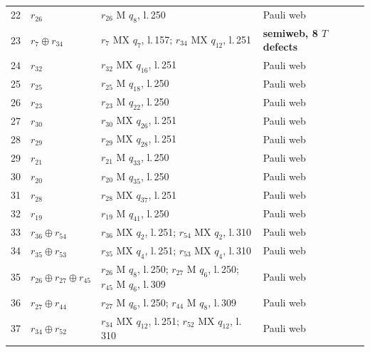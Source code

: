 \documentclass[11pt]{article}
\begin{document}
\begin{semiwebaddition}
{\begin{longtable}{rp{.3\linewidth}p{.43\linewidth}lr}
22 & $r_{26}$ & $r_{26}$ M $q_{8}$, l.\,250 & Pauli web & \hyperref[d5_det022]{\pageref*{d5_det022}}\\
23 & $r_{7}\oplus r_{34}$ & $r_{7}$ MX $q_{7}$, l.\,157; $r_{34}$ MX $q_{12}$, l.\,251 & \textbf{semiweb, 8 $T$ defects} & \hyperref[d5_det023]{\pageref*{d5_det023}}\\
24 & $r_{32}$ & $r_{32}$ MX $q_{16}$, l.\,251 & Pauli web & \hyperref[d5_det024]{\pageref*{d5_det024}}\\
25 & $r_{25}$ & $r_{25}$ M $q_{18}$, l.\,250 & Pauli web & \hyperref[d5_det025]{\pageref*{d5_det025}}\\
26 & $r_{23}$ & $r_{23}$ M $q_{22}$, l.\,250 & Pauli web & \hyperref[d5_det026]{\pageref*{d5_det026}}\\
27 & $r_{30}$ & $r_{30}$ MX $q_{26}$, l.\,251 & Pauli web & \hyperref[d5_det027]{\pageref*{d5_det027}}\\
28 & $r_{29}$ & $r_{29}$ MX $q_{28}$, l.\,251 & Pauli web & \hyperref[d5_det028]{\pageref*{d5_det028}}\\
29 & $r_{21}$ & $r_{21}$ M $q_{33}$, l.\,250 & Pauli web & \hyperref[d5_det029]{\pageref*{d5_det029}}\\
30 & $r_{20}$ & $r_{20}$ M $q_{35}$, l.\,250 & Pauli web & \hyperref[d5_det030]{\pageref*{d5_det030}}\\
31 & $r_{28}$ & $r_{28}$ MX $q_{37}$, l.\,251 & Pauli web & \hyperref[d5_det031]{\pageref*{d5_det031}}\\
32 & $r_{19}$ & $r_{19}$ M $q_{41}$, l.\,250 & Pauli web & \hyperref[d5_det032]{\pageref*{d5_det032}}\\
33 & $r_{36}\oplus r_{54}$ & $r_{36}$ MX $q_{2}$, l.\,251; $r_{54}$ MX $q_{2}$, l.\,310 & Pauli web & \hyperref[d5_det033]{\pageref*{d5_det033}}\\
34 & $r_{35}\oplus r_{53}$ & $r_{35}$ MX $q_{4}$, l.\,251; $r_{53}$ MX $q_{4}$, l.\,310 & Pauli web & \hyperref[d5_det034]{\pageref*{d5_det034}}\\
35 & $r_{26}\oplus r_{27}\oplus r_{45}$ & $r_{26}$ M $q_{8}$, l.\,250; $r_{27}$ M $q_{6}$, l.\,250; $r_{45}$ M $q_{6}$, l.\,309 & Pauli web & \hyperref[d5_det035]{\pageref*{d5_det035}}\\
36 & $r_{27}\oplus r_{44}$ & $r_{27}$ M $q_{6}$, l.\,250; $r_{44}$ M $q_{8}$, l.\,309 & Pauli web & \hyperref[d5_det036]{\pageref*{d5_det036}}\\
37 & $r_{34}\oplus r_{52}$ & $r_{34}$ MX $q_{12}$, l.\,251; $r_{52}$ MX $q_{12}$, l.\,310 & Pauli web & \hyperref[d5_det037]{\pageref*{d5_det037}}\\

\end{longtable}}
\end{semiwebaddition}
\end{document}
